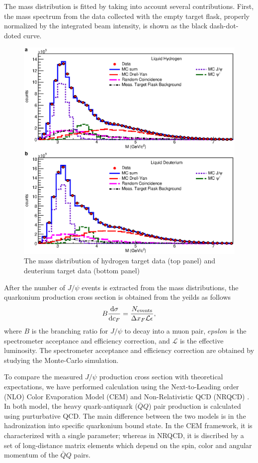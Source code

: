 \documentclass[10pt, a4paper,final]{article}
\begin{document}
The mass distribution is fitted by taking into account
several contributions. First, the mass spectrum from the data collected
with the empty target flask, properly normalized by the integrated beam
intensity, is shown as the black dash-dot-doted curve.

\begin{figure}[htbp!]
	\centering
	\includegraphics[width=0.65\linewidth]{extFig3}
	\caption{The mass distribution of hydrogen target data (top panel) and
		deuterium target data (bottom panel)\cite{dove2021}
		}
	\label{fig:mass}
\end{figure}

After the number of $J/\psi$ events is extracted from the mass distributions,
the quarkonium production cross section is obtained from the yeilds as follows
\begin{equation}
	B\dv{\sigma}{c_F} = \frac{N_{\textrm{events}}}{\Delta x_F \mathcal{L} \epsilon},
\end{equation}
where $B$ is the branching ratio for $J/\psi$ to decay into a muon pair,
$epslon$ is the spectrometer acceptance and efficiency correction, and
$\mathcal{L}$ is the effective luminosity. The spectrometer acceptance and
efficiency correction are obtained by studying the Monte-Carlo simulation.

To compare the measured $J/\psi$ production cross section with theoretical
expectations, we have performed calculation using the Next-to-Leading
order (NLO) Color Evaporation Model (CEM)\cite{mangano1993} and
Non-Relativistic QCD (NRQCD) \cite{bodwin1997}. In both model, the heavy
quark-antiquark ($\bar{Q}Q$) pair production is calculated using purturbative QCD.
The main difference between the two models is in the hadronization into specific
quarkonium bound state. In the CEM framework, it is characterized with a single
parameter; whereas in NRQCD, it is discribed by a set of long-distance matrix
elements which depend on the spin, color and angular momentum of the $\bar{Q}Q$
pairs.
\end{document}
